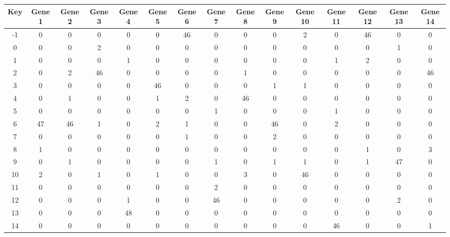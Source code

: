 \begin{tabular}{|c|c|c|c|c|c|c|c|c|c|c|c|c|c|c|}
\hline
Key & Gene 1 & Gene 2 & Gene 3 & Gene 4 & Gene 5 & Gene 6 & Gene 7 & Gene 8 & Gene 9 & Gene 10 & Gene 11 & Gene 12 & Gene 13 & Gene 14 \\
\hline
-1 & 0 & 0 & 0 & 0 & 0 & 46 & 0 & 0 & 0 & 2 & 0 & 46 & 0 & 0 \\
0 & 0 & 0 & 2 & 0 & 0 & 0 & 0 & 0 & 0 & 0 & 0 & 0 & 1 & 0 \\
1 & 0 & 0 & 0 & 1 & 0 & 0 & 0 & 0 & 0 & 0 & 1 & 2 & 0 & 0 \\
2 & 0 & 2 & 46 & 0 & 0 & 0 & 0 & 1 & 0 & 0 & 0 & 0 & 0 & 46 \\
3 & 0 & 0 & 0 & 0 & 46 & 0 & 0 & 0 & 1 & 1 & 0 & 0 & 0 & 0 \\
4 & 0 & 1 & 0 & 0 & 1 & 2 & 0 & 46 & 0 & 0 & 0 & 0 & 0 & 0 \\
5 & 0 & 0 & 0 & 0 & 0 & 0 & 1 & 0 & 0 & 0 & 1 & 0 & 0 & 0 \\
6 & 47 & 46 & 1 & 0 & 2 & 1 & 0 & 0 & 46 & 0 & 2 & 0 & 0 & 0 \\
7 & 0 & 0 & 0 & 0 & 0 & 1 & 0 & 0 & 2 & 0 & 0 & 0 & 0 & 0 \\
8 & 1 & 0 & 0 & 0 & 0 & 0 & 0 & 0 & 0 & 0 & 0 & 1 & 0 & 3 \\
9 & 0 & 1 & 0 & 0 & 0 & 0 & 1 & 0 & 1 & 1 & 0 & 1 & 47 & 0 \\
10 & 2 & 0 & 1 & 0 & 1 & 0 & 0 & 3 & 0 & 46 & 0 & 0 & 0 & 0 \\
11 & 0 & 0 & 0 & 0 & 0 & 0 & 2 & 0 & 0 & 0 & 0 & 0 & 0 & 0 \\
12 & 0 & 0 & 0 & 1 & 0 & 0 & 46 & 0 & 0 & 0 & 0 & 0 & 2 & 0 \\
13 & 0 & 0 & 0 & 48 & 0 & 0 & 0 & 0 & 0 & 0 & 0 & 0 & 0 & 0 \\
14 & 0 & 0 & 0 & 0 & 0 & 0 & 0 & 0 & 0 & 0 & 46 & 0 & 0 & 1 \\
\hline
\end{tabular}